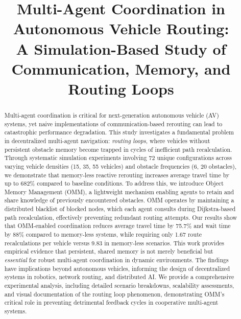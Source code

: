 \documentclass[conference]{IEEEtran}
\begin{document}
\title{Multi-Agent Coordination in Autonomous Vehicle Routing: \\A Simulation-Based Study of Communication, Memory, and Routing Loops}

\author{
}

\maketitle

\begin{abstract}
Multi-agent coordination is critical for next-generation autonomous vehicle (AV) systems, yet naive implementations of communication-based rerouting can lead to catastrophic performance degradation. This study investigates a fundamental problem in decentralized multi-agent navigation: \textit{routing loops}, where vehicles without persistent obstacle memory become trapped in cycles of inefficient path recalculation. Through systematic simulation experiments involving 72 unique configurations across varying vehicle densities (15, 35, 55 vehicles) and obstacle frequencies (6, 20 obstacles), we demonstrate that memory-less reactive rerouting increases average travel time by up to 682\% compared to baseline conditions. To address this, we introduce Object Memory Management (OMM), a lightweight mechanism enabling agents to retain and share knowledge of previously encountered obstacles. OMM operates by maintaining a distributed blacklist of blocked nodes, which each agent consults during Dijkstra-based path recalculation, effectively preventing redundant routing attempts. Our results show that OMM-enabled coordination reduces average travel time by 75.7\% and wait time by 88\% compared to memory-less systems, while requiring only 1.67 route recalculations per vehicle versus 9.83 in memory-less scenarios. This work provides empirical evidence that persistent, shared memory is not merely beneficial but \textit{essential} for robust multi-agent coordination in dynamic environments. The findings have implications beyond autonomous vehicles, informing the design of decentralized systems in robotics, network routing, and distributed AI. We provide a comprehensive experimental analysis, including detailed scenario breakdowns, scalability assessments, and visual documentation of the routing loop phenomenon, demonstrating OMM's critical role in preventing detrimental feedback cycles in cooperative multi-agent systems.
\end{abstract}
\end{document}
